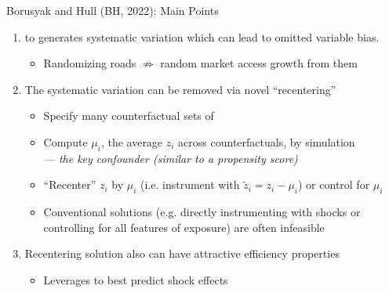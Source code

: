 \documentclass{beamer}
\begin{document}
\begin{frame}{Borusyak and Hull (BH, 2022): Main Points}
  
  {\small 
  \vspace{-3mm}
	\begin{enumerate}

	\item {} to  generates systematic variation which can lead to omitted variable bias. \pause 
  
  \vspace{-2mm}
  \begin{itemize}
    \item Randomizing roads $\not\Rightarrow$ random market access growth from them\pause 
  \end{itemize}

	\item The systematic variation can be removed via novel ``recentering''\pause 

    \vspace{-2mm}
		\begin{itemize}
		\item Specify many counterfactual sets of  
    
    \pause 
		\item Compute $\mu_i$, the average $z_i$ across counterfactuals, by simulation \\ \pause\emph{--- the key confounder (similar to a propensity score)}
    
    \pause 
		\item ``Recenter'' $z_i$ by $\mu_i$ (i.e. instrument with $\tilde{z}_i=z_i-\mu_i$) or control for $\mu_i$ 
    
    \pause 
		\item Conventional solutions (e.g. directly instrumenting with shocks or controlling for all features of exposure) are often infeasible 		
		\end{itemize}

  \pause 
	\item Recentering solution also can have attractive efficiency properties
    \vspace{-2mm}
    \begin{itemize}
	  	\item Leverages  to best predict shock effects
		\end{itemize}
	\end{enumerate}
  }
\end{frame}
\end{document}
